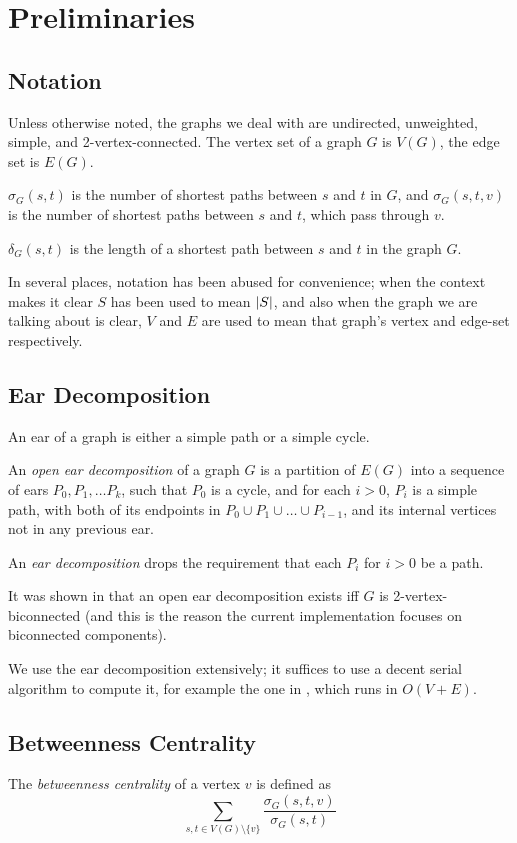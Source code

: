 \chapter{Preliminaries}
\label{prelim}

\section{Notation}
Unless otherwise noted, the graphs we deal with are undirected, unweighted,
simple, and 2-vertex-connected.
The vertex set of a graph $G$ is $V(G)$, the edge set is $E(G)$.

$\sigma_G(s, t)$ is the number of shortest paths between $s$ and $t$ in $G$,
and $\sigma_G(s, t, v)$ is the number of shortest paths between $s$ and $t$,
which pass through $v$.

$\delta_G(s, t)$ is the length of a shortest path between $s$ and $t$
in the graph $G$.

In several places, notation has been abused for convenience;
when the context makes it clear $S$ has been used to mean $\card{S}$,
and also when the graph we are talking about is clear, $V$ and $E$ are
used to mean that graph's vertex and edge-set respectively.

\section{Ear Decomposition}
An ear of a graph is either a simple path or a simple cycle.

An \emph{open ear decomposition} of a graph $G$ is a partition of $E(G)$ into
a sequence of ears $P_0, P_1, \dots P_k$, such that
$P_0$ is a cycle, and for each $i > 0$, $P_i$ is a simple path,
with both of its endpoints in $P_0 \cup P_1 \cup\dots\cup P_{i - 1}$, and
its internal vertices not in any previous ear.

An \emph{ear decomposition} drops the requirement that each $P_i$ for $i > 0$
be a path.

It was shown in \cite{whitney32} that an open ear decomposition exists iff
$G$ is 2-vertex-biconnected (and this is the reason the current implementation
focuses on biconnected components).

We use the ear decomposition extensively;
it suffices to use a decent serial algorithm to compute it, for example the
one in \cite{schmidt13}, which runs in $O(V + E)$.

\section{Betweenness Centrality}
The \emph{betweenness centrality} of a vertex $v$ is defined as
\[ \sum_{s, t \in V(G)\setminus \{v\}}
	\frac{\sigma_G(s, t, v)}{\sigma_G(s, t)} \]

